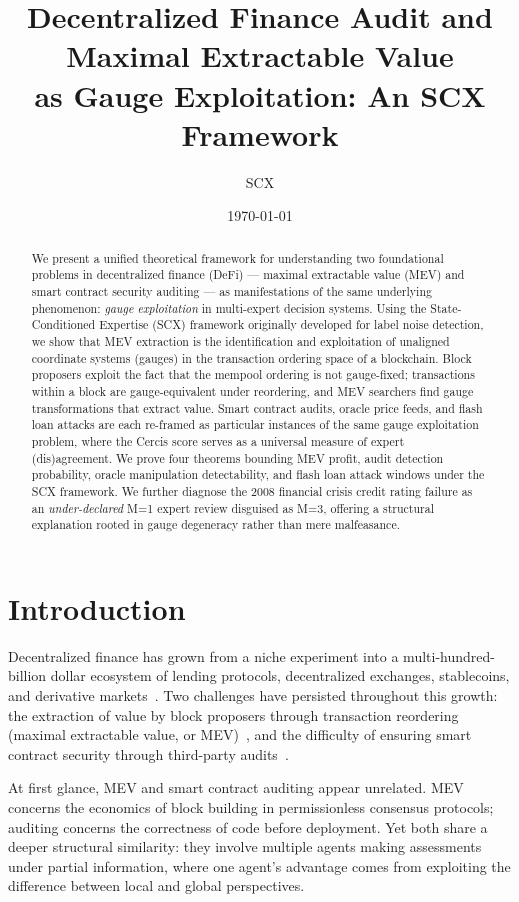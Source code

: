\documentclass[12pt,a4paper]{article}
\title{\textbf{Decentralized Finance Audit and Maximal Extractable Value\\
as Gauge Exploitation: An SCX Framework}}
\author{SCX}
\date{\today}
\theoremstyle{remark}
\newcommand{\Cercis}{\textsf{Cercis}}
\begin{document}
\maketitle

\begin{abstract}
We present a unified theoretical framework for understanding two foundational
problems in decentralized finance (DeFi) --- maximal extractable value (MEV)
and smart contract security auditing --- as manifestations of the same
underlying phenomenon: \emph{gauge exploitation} in multi-expert decision
systems. Using the State-Conditioned Expertise (SCX) framework originally
developed for label noise detection, we show that MEV extraction is the
identification and exploitation of unaligned coordinate systems (gauges) in
the transaction ordering space of a blockchain. Block proposers exploit the
fact that the mempool ordering is not gauge-fixed; transactions within a block
are gauge-equivalent under reordering, and MEV searchers find gauge
transformations that extract value. Smart contract audits, oracle price feeds,
and flash loan attacks are each re-framed as particular instances of the same
gauge exploitation problem, where the \Cercis{} score serves as a universal
measure of expert (dis)agreement. We prove four theorems bounding MEV profit,
audit detection probability, oracle manipulation detectability, and flash loan
attack windows under the SCX framework. We further diagnose the 2008 financial
crisis credit rating failure as an \emph{under-declared} M=1 expert review
disguised as M=3, offering a structural explanation rooted in gauge
degeneracy rather than mere malfeasance.
\end{abstract}

\section{Introduction}
\label{sec:introduction}

Decentralized finance has grown from a niche experiment into a multi-hundred-billion
dollar ecosystem of lending protocols, decentralized exchanges, stablecoins, and
derivative markets~\cite{schaer2021defi}. Two challenges have persisted throughout
this growth: the extraction of value by block proposers through transaction
reordering (maximal extractable value, or MEV)~\cite{daian2020flashboys}, and
the difficulty of ensuring smart contract security through third-party
audits~\cite{li2020survey}.

At first glance, MEV and smart contract auditing appear unrelated. MEV concerns
the economics of block building in permissionless consensus protocols; auditing
concerns the correctness of code before deployment. Yet both share a deeper
structural similarity: they involve multiple agents making assessments under
partial information, where one agent's advantage comes from exploiting the
difference between local and global perspectives.
\end{document}
